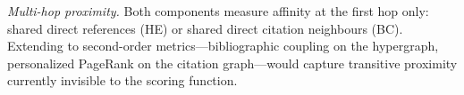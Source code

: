 \textit{Multi-hop proximity.}  Both components measure affinity at the
first hop only: shared direct references (HE) or shared direct
citation neighbours (BC).  Extending to second-order
metrics---bibliographic coupling on the hypergraph, personalized
PageRank on the citation graph---would capture transitive proximity
currently invisible to the scoring function.